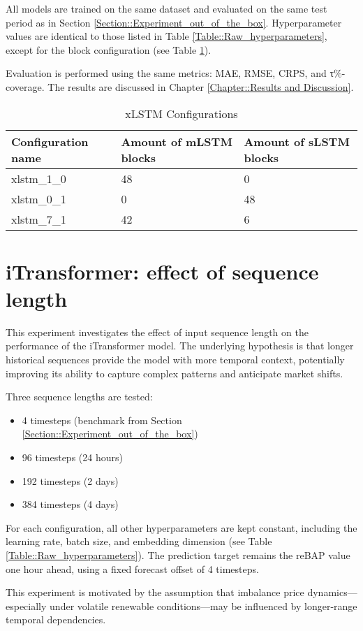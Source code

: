 \documentclass[class=scrbook, crop=false]{standalone}
\begin{document}
All models are trained on the same dataset and evaluated on the same test period as in Section \ref{Section::Experiment_out_of_the_box}. Hyperparameter values are identical to those listed in Table \ref{Table::Raw_hyperparameters}, except for the block configuration (see Table \ref{Table::xLSTM_configuratiosn}).

Evaluation is performed using the same metrics: MAE, RMSE, CRPS, and τ\%-coverage. The results are discussed in Chapter \ref{Chapter::Results and Discussion}.


  \begin{table}[]
\centering
\begin{tabular}{l|l|l}
 Configuration name & Amount of mLSTM blocks & Amount of sLSTM blocks  \\\hline
 xlstm\_1\_0 & 48 & 0 \\
 xlstm\_0\_1 & 0 & 48 \\
 xlstm\_7\_1  & 42 & 6 
\end{tabular}
\caption{xLSTM Configurations}
\label{Table::xLSTM_configuratiosn}
\end{table}
   
\section{iTransformer: effect of sequence length}
This experiment investigates the effect of input sequence length on the performance of the iTransformer model. The underlying hypothesis is that longer historical sequences provide the model with more temporal context, potentially improving its ability to capture complex patterns and anticipate market shifts.

Three sequence lengths are tested:
\begin{itemize}
\item 4 timesteps (benchmark from Section \ref{Section::Experiment_out_of_the_box})
\item 96 timesteps (24 hours)
\item 192 timesteps (2 days)
\item  384 timesteps (4 days)
\end{itemize}

For each configuration, all other hyperparameters are kept constant, including the learning rate, batch size, and embedding dimension (see Table \ref{Table::Raw_hyperparameters}). The prediction target remains the reBAP value one hour ahead, using a fixed forecast offset of 4 timesteps.

This experiment is motivated by the assumption that imbalance price dynamics—especially under volatile renewable conditions—may be influenced by longer-range temporal dependencies.
\end{document}
